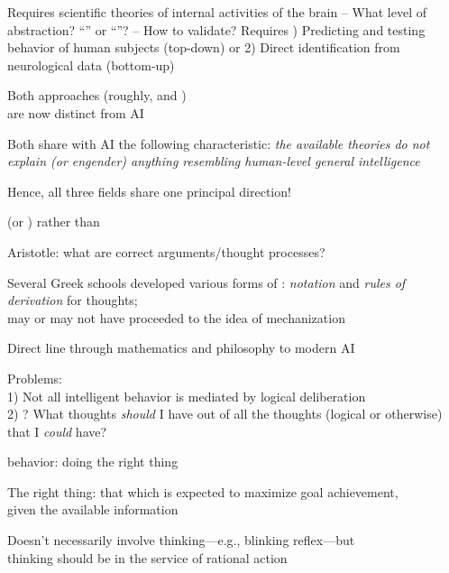 \documentclass{beamer}
\begin{document}
\begin{huge}
Requires scientific theories of internal activities of the brain\al
 -- What level of abstraction? ``'' or ``''?\al
 -- How to validate? Requires ) Predicting and testing behavior of human subjects (top-down)\nl
    or 2) Direct identification from neurological data (bottom-up)

Both approaches (roughly,  and ) \\
are now distinct from AI

Both share with AI the following characteristic:\al
   \emph{the available theories do not explain (or engender)\al
   anything resembling human-level general intelligence}

Hence, all three fields share one principal direction!




 (or ) rather than 

Aristotle: what are correct arguments/thought processes?

Several Greek schools developed various forms of :\al
   \emph{notation} and \emph{rules of derivation} for thoughts;\\
may or may not have proceeded to the idea of mechanization

Direct line through mathematics and philosophy to modern AI

Problems: \\
1) Not all intelligent behavior is mediated by logical deliberation\\
2) ? What thoughts \emph{should} I have\al
   out of all the thoughts (logical or otherwise) that I \emph{could} have?




 behavior: doing the right thing

The right thing: that which is expected to maximize goal achievement,\\
given the available information

Doesn't necessarily involve thinking---e.g., blinking reflex---but\\
thinking should be in the service of rational action


\end{huge}
\end{document}
